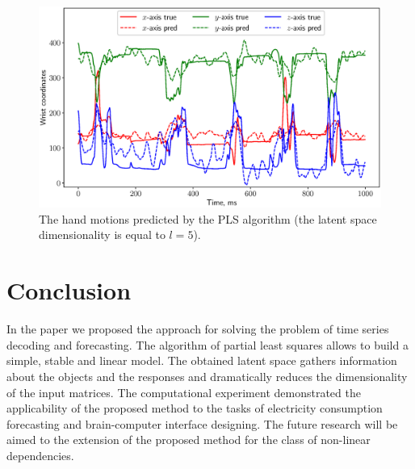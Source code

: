 \documentclass[12pt,twoside]{article}
\begin{document}
\begin{figure}[!h]
	\centering
	\includegraphics[width=\textwidth]{figs/ecog_prediction}
	\caption{The hand motions predicted by the PLS algorithm (the latent space dimensionality is equal to $l=5$).}
	\label{fig::ecog_prediction}
\end{figure}

\section{Conclusion}
In the paper we proposed the approach for solving the problem of time series decoding and forecasting. 
The algorithm of partial least squares allows to build a simple, stable and linear model. 
The obtained latent space gathers information about the objects and the responses and dramatically reduces the dimensionality of the input matrices. 
The computational experiment demonstrated the applicability of the proposed method to the tasks of electricity consumption forecasting and brain-computer interface designing.
The future research will be aimed to the extension of the proposed method for the class of non-linear dependencies.



\end{document}
